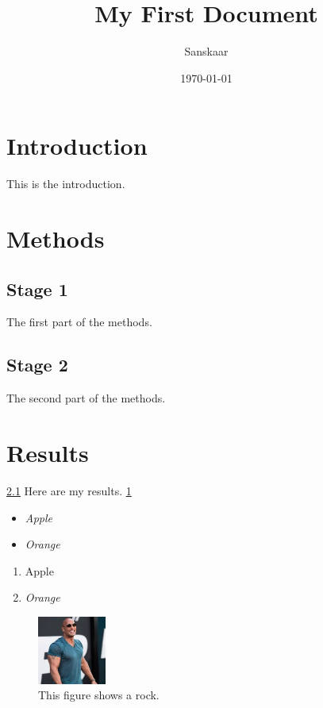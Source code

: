 \documentclass[a4paper,12pt]{article}
\begin{document}
	\title{My First Document}
	\author{Sanskaar}
	\date{\today}
	\maketitle
	\tableofcontents
	\newpage
	\section{Introduction}
	This is the introduction.
	\section{Methods}
	\subsection{Stage 1}
	\label{sec1}
	The first part of the methods.
	\subsection{Stage 2}
	The second part of the methods.
	\section{Results}
	\ref{sec1}
	Here are my results.
	\ref{Cross-refernce_key}
	\begin{itemize}
		\item \textit{Apple}
		\item\textsl{Orange} 
	\end{itemize}
   \begin{enumerate}
   	\item {\small \textup{ Apple}}
  	\item \textsl{Orange}
   \end{enumerate}
\begin{figure}[!h]
	\centering
	\includegraphics[width=0.2\textwidth]{index.jpeg}
	\caption{This figure shows a rock.}
	\label{Cross-refernce_key}
\end{figure}
\end{document}

